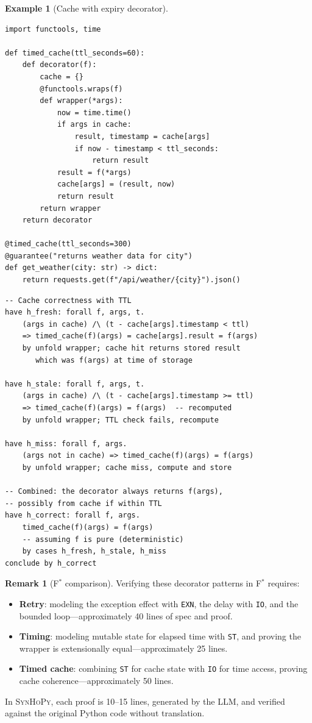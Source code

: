 \documentclass[11pt,a4paper]{report}
\theoremstyle{definition}
\newtheorem{example}[definition]{Example}
\newtheorem{remark}[definition]{Remark}
\theoremstyle{plain}
\newcommand{\fstar}{F$^{*}$}
\newcommand{\synhopy}{\textsc{SynHoPy}}
\begin{document}
\begin{example}[Cache with expiry decorator]
\begin{lstlisting}[style=synhopy]
import functools, time

def timed_cache(ttl_seconds=60):
    def decorator(f):
        cache = {}
        @functools.wraps(f)
        def wrapper(*args):
            now = time.time()
            if args in cache:
                result, timestamp = cache[args]
                if now - timestamp < ttl_seconds:
                    return result
            result = f(*args)
            cache[args] = (result, now)
            return result
        return wrapper
    return decorator

@timed_cache(ttl_seconds=300)
@guarantee("returns weather data for city")
def get_weather(city: str) -> dict:
    return requests.get(f"/api/weather/{city}").json()
\end{lstlisting}

\begin{lstlisting}[style=proof]
-- Cache correctness with TTL
have h_fresh: forall f, args, t.
    (args in cache) /\ (t - cache[args].timestamp < ttl)
    => timed_cache(f)(args) = cache[args].result = f(args)
    by unfold wrapper; cache hit returns stored result
       which was f(args) at time of storage

have h_stale: forall f, args, t.
    (args in cache) /\ (t - cache[args].timestamp >= ttl)
    => timed_cache(f)(args) = f(args)  -- recomputed
    by unfold wrapper; TTL check fails, recompute

have h_miss: forall f, args.
    (args not in cache) => timed_cache(f)(args) = f(args)
    by unfold wrapper; cache miss, compute and store

-- Combined: the decorator always returns f(args),
-- possibly from cache if within TTL
have h_correct: forall f, args.
    timed_cache(f)(args) = f(args)
    -- assuming f is pure (deterministic)
    by cases h_fresh, h_stale, h_miss
conclude by h_correct
\end{lstlisting}
\end{example}

\begin{remark}[\fstar{} comparison]
Verifying these decorator patterns in \fstar{} requires:
\begin{itemize}
  \item \textbf{Retry}: modeling the exception effect with
    \lstinline[style=fstar]|EXN|, the delay with \lstinline[style=fstar]|IO|,
    and the bounded loop---approximately 40 lines of spec and proof.
  \item \textbf{Timing}: modeling mutable state for elapsed time with
    \lstinline[style=fstar]|ST|, and proving the wrapper is extensionally
    equal---approximately 25 lines.
  \item \textbf{Timed cache}: combining \lstinline[style=fstar]|ST| for cache
    state with \lstinline[style=fstar]|IO| for time access, proving
    cache coherence---approximately 50 lines.
\end{itemize}
In \synhopy{}, each proof is 10--15 lines, generated by the LLM, and verified
against the original Python code without translation.
\end{remark}
\end{document}
